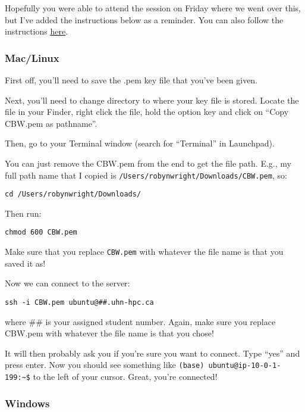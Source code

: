 \documentclass[
]{book}
\begin{document}
Hopefully you were able to attend the session on Friday where we went over this, but I've added the instructions below as a reminder. You can also follow the instructions \href{https://github.com/bioinformaticsdotca/AWS_stuff/blob/master/Logging_into_the_Amazon_cloud.md}{here}.

\subsubsection{Mac/Linux}\label{maclinux}

First off, you'll need to save the .pem key file that you've been given.

Next, you'll need to change directory to where your key file is stored. Locate the file in your Finder, right click the file, hold the option key and click on ``Copy CBW.pem as pathname''.

Then, go to your Terminal window (search for ``Terminal'' in Launchpad).

You can just remove the CBW.pem from the end to get the file path. E.g., my full path name that I copied is \texttt{/Users/robynwright/Downloads/CBW.pem}, so:

\begin{verbatim}
cd /Users/robynwright/Downloads/
\end{verbatim}

Then run:

\begin{verbatim}
chmod 600 CBW.pem
\end{verbatim}

Make sure that you replace \texttt{CBW.pem} with whatever the file name is that you saved it as!

Now we can connect to the server:

\begin{verbatim}
ssh -i CBW.pem ubuntu@##.uhn-hpc.ca
\end{verbatim}

where \#\# is your assigned student number. Again, make sure you replace CBW.pem with whatever the file name is that you chose!

It will then probably ask you if you're sure you want to connect. Type ``yes'' and press enter. Now you should see something like \texttt{(base)\ ubuntu@ip-10-0-1-199:\textasciitilde{}\$} to the left of your cursor. Great, you're connected!

\subsubsection{Windows}\label{windows}
\end{document}
